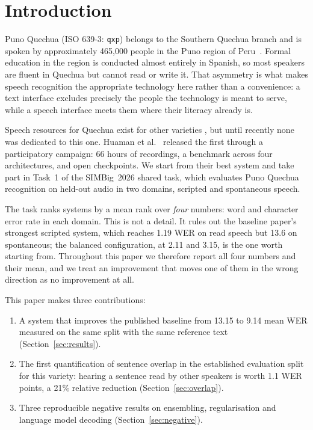 \section{Introduction}
\label{sec:intro}

Puno Quechua (ISO 639-3: \texttt{qxp}) belongs to the Southern Quechua branch
and is spoken by approximately 465{,}000 people in the Puno region of
Peru~\cite{huaman2026punoasr}. Formal education in the region is conducted
almost entirely in Spanish, so most speakers are fluent in Quechua but cannot
read or write it. That asymmetry is what makes speech recognition the
appropriate technology here rather than a convenience: a text interface excludes
precisely the people the technology is meant to serve, while a speech interface
meets them where their literacy already is.

Speech resources for Quechua exist for other varieties
\cite{cardenas2018siminchik,paccotacya2022collao}, but until recently none was
dedicated to this one. Huaman et
al.~\cite{huaman2026punoasr} released the first through a participatory
campaign: 66 hours of recordings, a benchmark across four architectures, and
open checkpoints. We start from their best system and take part in Task~1 of
the SIMBig~2026 shared task, which evaluates Puno Quechua recognition on
held-out audio in two domains, scripted and spontaneous speech.

The task ranks systems by a mean rank over \emph{four} numbers: word and
character error rate in each domain. This is not a detail. It rules out the
baseline paper's strongest scripted system, which reaches 1.19 WER on read
speech but 13.6 on spontaneous; the balanced configuration, at 2.11 and 3.15,
is the one worth starting from. Throughout this paper we therefore report all
four numbers and their mean, and we treat an improvement that moves one of them
in the wrong direction as no improvement at all.

This paper makes three contributions:

\begin{enumerate}
  \item A system that improves the published baseline from 13.15 to 9.14 mean
        WER measured on the same split with the same reference text
        (Section~\ref{sec:results}).
  \item The first quantification of sentence overlap in the established
        evaluation split for this variety: hearing a sentence read by other
        speakers is worth 1.1 WER points, a 21\% relative reduction
        (Section~\ref{sec:overlap}).
  \item Three reproducible negative results on ensembling, regularisation and
        language model decoding (Section~\ref{sec:negative}).
\end{enumerate}

